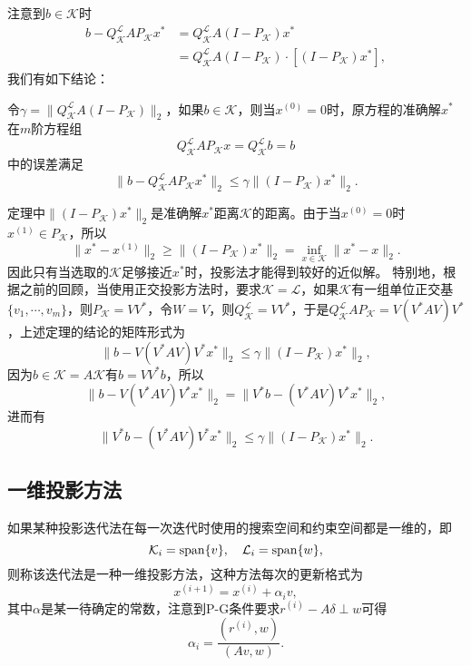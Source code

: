 \documentclass[a4paper,10pt]{ctexart}
\begin{document}
注意到$ b\in \mathcal{K} $时
\[
    \begin{aligned}
        b - Q_{\mathcal{K}}^{\mathcal{L}}AP_{\mathcal{K}}x^*
        &= Q_{\mathcal{K}}^{\mathcal{L}}A (I - P_{\mathcal{K}})x^*\\
        &= Q_{\mathcal{K}}^{\mathcal{L}}A (I - P_{\mathcal{K}})\cdot [(I - P_{\mathcal{K}})x^*],
    \end{aligned}
\]
我们有如下结论：
\begin{theorem}
    令$ \gamma = \| Q_{\mathcal{K}}^{\mathcal{L}}A(I-P_{\mathcal{K}}) \|_2 $，如果$ b\in \mathcal{K} $，则当$ x^{(0)} = 0 $时，原方程的准确解$ x^* $在$ m $阶方程组
    \[
        Q_{\mathcal{K}}^{\mathcal{L}}AP_{\mathcal{K}}x =  Q_{\mathcal{K}}^{\mathcal{L}}b = b
    \]
    中的误差满足
    \begin{equation}
        \|  b - Q_{\mathcal{K}}^{\mathcal{L}}AP_{\mathcal{K}}x^* \|_2\leqslant \gamma \| (I-P_{\mathcal{K}})x^* \|_2.
    \end{equation}
\end{theorem}
\noindent 定理中$ \| (I-P_{\mathcal{K}})x^* \|_2 $是准确解$ x^* $距离$ \mathcal{K} $的距离。由于当$ x^{(0)} = 0 $时$ x^{(1)} \in P_{\mathcal{K}} $，所以
\[
    \| x^* - x^{(1)} \|_2 \geqslant \| (I-P_{\mathcal{K}})x^* \|_2 = \inf_{x\in \mathcal{K}} \| x^* - x \|_2.
\]
因此只有当选取的$ \mathcal{K} $足够接近$ x^* $时，投影法才能得到较好的近似解。
特别地，根据之前的回顾，当使用正交投影方法时，要求$ \mathcal{K} = \mathcal{L} $，如果$ \mathcal{K} $有一组单位正交基$ \{v_{1}, \cdots , v_{m}\} $，则$ P_{\mathcal{K}} = VV^* $，令$ W = V $，则$ Q_{\mathcal{K}}^{\mathcal{L}} = VV^* $，于是$ Q_{\mathcal{K}}^{\mathcal{L}}A P_{\mathcal{K}} = V(V^*AV)V^* $，上述定理的结论的矩阵形式为
\begin{equation}
    \| b - V(V^*AV)V^* x^* \|_2 \leqslant \gamma \| (I-P_{\mathcal{K}})x^* \|_2,
\end{equation}
因为$ b \in \mathcal{K} = A \mathcal{K} $有$ b = VV^* b $，所以
\[
    \| b - V(V^*AV)V^* x^* \|_2 = \| V^*b - (V^*AV)V^* x^* \|_2,
\]
进而有
\begin{equation}
    \| V^*b - (V^*AV)V^* x^* \|_2 \leqslant \gamma \| (I-P_{\mathcal{K}})x^* \|_2.
\end{equation}

\subsection{一维投影方法}
如果某种投影迭代法在每一次迭代时使用的搜索空间和约束空间都是一维的，即
\[
    \mathcal{K}_i = {\rm span}\{v\},\quad \mathcal{L}_i = {\rm span}\{w\},
\]
则称该迭代法是一种一维投影方法，这种方法每次的更新格式为
\begin{equation}
    x^{(i+1)} = x^{(i)} + \alpha_i v,
\end{equation}
其中$ \alpha $是某一待确定的常数，注意到P-G条件要求$ r^{(i)} - A \delta\perp w $可得
\[
    \alpha_i = \frac{(r^{(i)}, w)}{(Av, w)}.
\]
\end{document}
